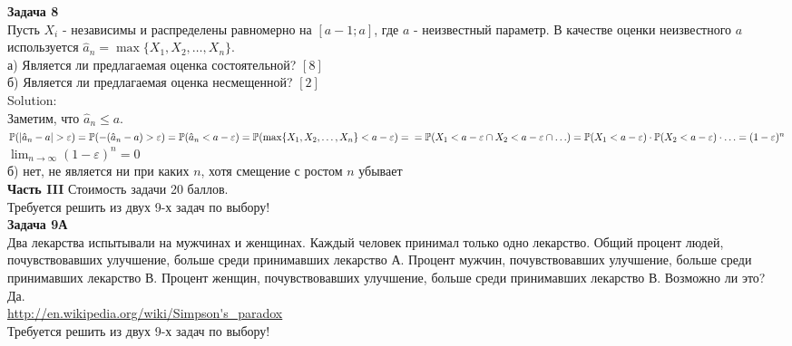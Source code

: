 \documentclass[12pt, a4paper]{article}\usepackage[]{graphicx}\usepackage[]{color}
\begin{document}
\textbf{Задача 8} \\ %
Пусть $X_{i}$ - независимы и распределены равномерно на $[a-1;a]$, где $a$ - неизвестный параметр. В качестве оценки неизвестного $a$ используется $\hat{a}_{n}=\max\{X_{1},X_{2},\ldots,X_{n}\}$. \\
а) Является ли предлагаемая оценка состоятельной? $[8]$ \\
б) Является ли предлагаемая оценка несмещенной? $[2]$ \\
Solution: \\
Заметим, что $\hat{a}_{n}\leq a$. \\
$\P(|\hat{a}_{n}-a|>\varepsilon)=\P(-(\hat{a}_{n}-a)>\varepsilon)=\P(\hat{a}_{n}<a-\varepsilon)=\P(\max\{X_{1},X_{2},\ldots,X_{n}\}<a-\varepsilon)= \\
=\P(X_{1}<a-\varepsilon \cap X_{2}< a-\varepsilon\cap \ldots)=
\P(X_{1}<a-\varepsilon)\cdot \P(X_{2}<a-\varepsilon)\cdot \ldots=(1-\varepsilon)^{n}$ \\
$\lim_{n\to\infty} (1-\varepsilon)^{n} =0$ \\
б) нет, не является ни при каких $n$, хотя смещение с ростом $n$ убывает \\


\textbf{Часть III} Стоимость задачи 20 баллов. \\

Требуется решить \textbf{} из двух 9-х задач по
выбору! \\


\textbf{Задача 9А} \\
Два лекарства испытывали на мужчинах и женщинах. Каждый
человек принимал только одно лекарство. Общий процент людей,
почувствовавших улучшение, больше среди принимавших лекарство А.
Процент мужчин, почувствовавших улучшение, больше среди принимавших лекарство В. Процент женщин, почувствовавших улучшение, больше среди принимавших лекарство В. Возможно ли это? \\
Да. \\
\url{http://en.wikipedia.org/wiki/Simpson's_paradox} \\

Требуется решить \textbf{} из двух 9-х задач по
выбору! \\
\end{document}
